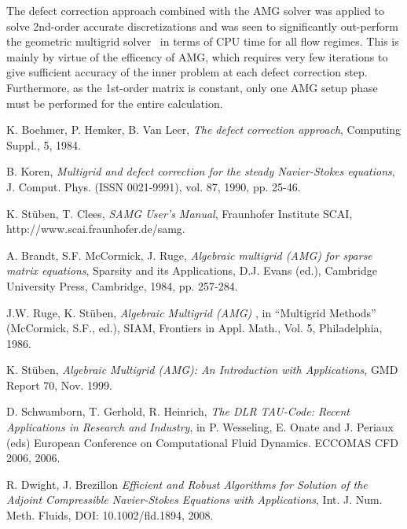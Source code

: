 \documentclass{report}
\begin{document}
The defect correction approach combined with the AMG solver was applied
to solve 2nd-order accurate
discretizations and was seen to significantly out-perform the geometric
multigrid solver~\cite{TAU, TAU_lin}
in terms of CPU time for all flow regimes. This is mainly by virtue of
the efficency of AMG, which requires
very few iterations to give sufficient accuracy of the inner problem at
each defect correction step.
Furthermore, as the 1st-order matrix is constant, only one AMG setup
phase must be performed for
the entire calculation.

\nopagebreak[4]
\begin{thebibliography}{99}

K. Boehmer, P. Hemker, B. Van Leer,
{\em The defect correction approach},
Computing Suppl., 5, 1984.

B. Koren,
{\em Multigrid and defect correction for the steady Navier-Stokes equations},
J. Comput. Phys. (ISSN 0021-9991), vol. 87, 1990, pp. 25-46.

K. St{\"u}ben, T. Clees,
{\em SAMG User's Manual},
Fraunhofer Institute SCAI, http://www.scai.fraunhofer.de/samg.

A. Brandt, S.F. McCormick, J. Ruge,
{\em Algebraic multigrid (AMG) for sparse matrix equations},
Sparsity and its Applications, D.J. Evans (ed.),
Cambridge University Press, Cambridge, 1984, pp. 257-284.

J.W. Ruge, K. St{\"u}ben,
{\em Algebraic Multigrid (AMG) },
in ``Multigrid Methods'' (McCormick, S.F., ed.), SIAM, Frontiers in Appl. Math., Vol. 5,
Philadelphia, 1986.

K. St{\"u}ben,
{ \em Algebraic Multigrid (AMG): An Introduction with Applications},
GMD Report 70, Nov. 1999.

D. Schwamborn, T. Gerhold, R. Heinrich,
{ \em The DLR TAU-Code: Recent Applications in Research and Industry},
in P. Wesseling, E. Onate and J. Periaux (eds) European Conference on
Computational Fluid Dynamics. ECCOMAS CFD 2006, 2006.

R. Dwight, J. Brezillon
{ \em Efficient and Robust Algorithms for Solution of the Adjoint
Compressible Navier-Stokes Equations with Applications},
Int. J. Num. Meth. Fluids, DOI: 10.1002/fld.1894, 2008.

\end{thebibliography}
\end{document}
